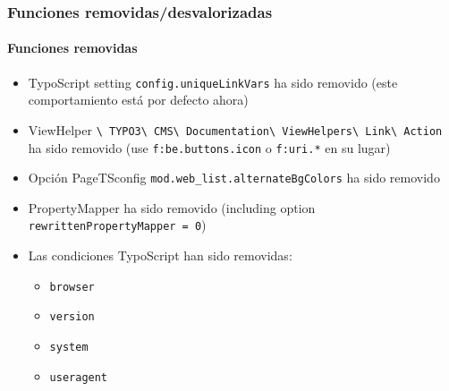 \begin{frame}[fragile]
	\frametitle{Funciones removidas/desvalorizadas}
	\framesubtitle{Funciones removidas}

	\begin{itemize}

		\item
			\small
				TypoScript setting \texttt{config.uniqueLinkVars} ha sido removido\newline
				(este comportamiento está por defecto ahora)
			\normalsize

		\item
			\small
				ViewHelper
					\texttt{\textbackslash
						TYPO3\textbackslash
						CMS\textbackslash
						Documentation\textbackslash
						ViewHelpers\textbackslash
						Link\textbackslash
						Action}
					ha sido removido (use \texttt{f:be.buttons.icon} o \texttt{f:uri.*} en su lugar)
			\normalsize

		\item
			\small
				Opción PageTSconfig \texttt{mod.web\_list.alternateBgColors}\newline
				ha sido removido
			\normalsize

		\item
			\small
				PropertyMapper ha sido removido\newline
				(including option \texttt{rewrittenPropertyMapper = 0})
			\normalsize

		\item
			\small
				Las condiciones TypoScript han sido removidas:

					\begin{itemize}
						\item\texttt{browser}
						\item\texttt{version}
						\item\texttt{system}
						\item\texttt{useragent}
					\end{itemize}
			\normalsize

	\end{itemize}

\end{frame}


